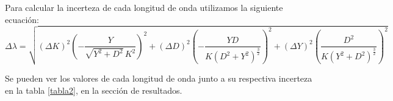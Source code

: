 \documentclass[12pt, a4paper]{article}
\begin{document}
Para calcular la incerteza de cada longitud de onda utilizamos la siguiente ecuación:
\begin{equation}
  {\Delta}{\lambda} = \sqrt{({\Delta}K)^2(-\frac{Y}{\sqrt{Y^{2} + 
  D^{2}} \, K^{2}})^2 + ({\Delta}D)^2(-\frac{YD}{K \left(D^{2} + Y^{2}\right)^{\frac{3}{2}}})^2+({\Delta}Y)^2(\frac{D^{2}}{K \left(Y^{2} 
  + D^{2}\right)^{\frac{3}{2}}})^2}
\label{equation4}
\end{equation}

Se pueden ver los valores de cada longitud de onda junto a su respectiva incerteza en la tabla \ref{tabla2}, en la sección de resultados.

\newpage
\end{document}
